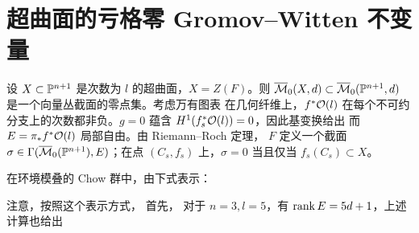 \section{超曲面的亏格零 Gromov–Witten 不变量}
设 $X\subset\mathbb P^{n+1}$ 是次数为 $l$ 的超曲面，$X=Z(F)$。则 $\overline{\mathcal M}_0(X,d)\subset\overline{\mathcal M}_0(\mathbb P^{n+1},d)$ 是一个向量丛截面的零点集。考虑万有图表
在几何纤维上，$f^*\mathcal O(l)$ 在每个不可约分支上的次数都非负。$g=0$ 蕴含 $H^1(f_s^*\mathcal O(l))=0$，因此基变换给出
而 $E=\pi_*f^*\mathcal O(l)$ 局部自由。由 Riemann–Roch 定理，
$F$ 定义一个截面 $\sigma\in\Gamma(\overline{\mathcal M}_0(\mathbb P^{n+1}),E)$；在点 $(C_s,f_s)$ 上，$\sigma=0$ 当且仅当 $f_s(C_s)\subset X$。
\begin{definition}[Kontsevich]\label{def:3.2}
在环境模叠的 Chow 群中，由下式表示：
\end{definition}
注意，按照这个表示方式，
首先，
对于 $n=3,l=5$，有 $\operatorname{rank} E=5d+1$，上述计算也给出
